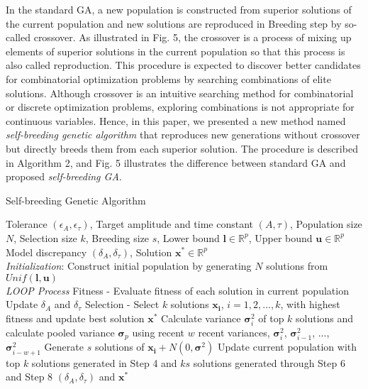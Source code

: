 \documentclass[10pt,letterpaper]{article}
\begin{document}
In the standard GA, a new population is constructed from superior solutions of the current population and new solutions are reproduced in Breeding step by so-called crossover. As illustrated in Fig. 5, the crossover is a process of mixing up elements of superior solutions in the current population so that this process is also called reproduction. This procedure is expected to discover better candidates for combinatorial optimization problems by searching combinations of elite solutions. Although crossover is an intuitive searching method for combinatorial or discrete optimization problems, exploring combinations is not appropriate for continuous variables. Hence, in this paper, we presented a new method named \textit{self-breeding genetic algorithm} that reproduces new generations without crossover but directly breeds them from each superior solution. The procedure is described in Algorithm 2, and Fig. 5 illustrates the difference between standard GA and proposed \textit{self-breeding GA}.
\begin{algorithm}
    \caption{Self-breeding Genetic Algorithm}
    \begin{algorithmic}[1-=0+-*]
        \renewcommand{\algorithmicrequire}{\textbf{Input:}}
        \renewcommand{\algorithmicensure}{\textbf{Output:}}
        \REQUIRE Tolerance $(\epsilon_{A}, \epsilon_{\tau})$, Target amplitude and time constant $(A, \tau)$, Population size $N$, Selection size $k$, Breeding size $s$, Lower bound $\mathbf{l} \in \mathbb{R}^p$, Upper bound $\mathbf{u} \in \mathbb{R}^p$
        \ENSURE Model discrepancy $(\delta_{A}, \delta_{\tau})$, Solution $\mathbf{x}^* \in \mathbb{R}^p$
        \\ \textit{Initialization}:
        \STATE Construct initial population by generating $N$ solutions from $Unif(\mathbf{l}, \mathbf{u})$
        \\ \textit{LOOP Process}
        \STATE Fitness - Evaluate fitness of each solution in current population        
        \STATE Update $\delta_{A}$ and $\delta_{\tau}$
        \STATE Selection - Select $k$ solutions $\mathbf{x_i}$, $i=1,2,...,k$, with highest fitness and update best solution $\mathbf{x^{*}}$
        \STATE Calculate variance $\mathbf{\sigma}^2_{i}$ of top $k$ solutions and calculate pooled variance $\mathbf{\sigma}_{p}$ using recent $w$ recent variances, $\mathbf{\sigma}^2_{i}$, $\mathbf{\sigma}^2_{i-1}$, ..., $\mathbf{\sigma}^2_{i-w+1}$
            \STATE Generate $s$ solutions of $\mathbf{x_i} + N(0,\mathbf{\sigma}^2)$
        \ENDFOR
        \STATE Update current population with top $k$ solutions generated in Step 4 and $ks$ solutions generated through Step 6 and Step 8
        \ENDWHILE
        \RETURN $(\delta_{A}, \delta_{\tau})$ and $\mathbf{x}^*$
    \end{algorithmic} 
\end{algorithm}
\end{document}
